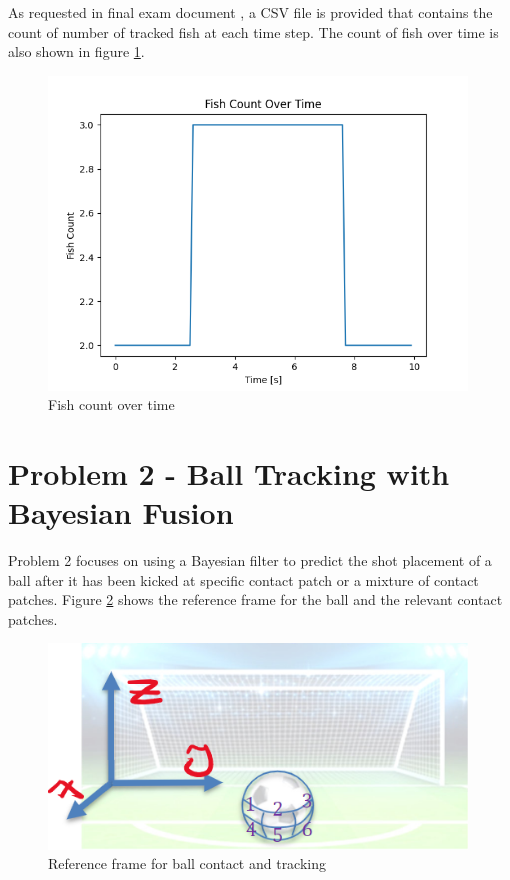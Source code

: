 \documentclass[12pt]{article}
\begin{document}
As requested in final exam document \cite{final-exam}, a CSV file is provided that contains the count of number of tracked fish at each time step. The count of fish over time is also shown in figure \ref{fig:p1-fish-count}.

\begin{figure}[H]
    \centering
    \includegraphics[width=0.99\textwidth]{Problem 1/out/p1_fish_count.png}
    \caption{Fish count over time}
    \label{fig:p1-fish-count}
\end{figure}

\section{Problem 2 - Ball Tracking with Bayesian Fusion}
Problem 2 focuses on using a Bayesian filter to predict the shot placement of a ball after it has been kicked at specific contact patch or a mixture of contact patches. Figure \ref{fig:p2-reference-frame} shows the reference frame for the ball and the relevant contact patches.

\begin{figure}[H]
    \centering
    \includegraphics[width=0.99\textwidth]{Problem 2/assets/axis-plane.png}
    \caption{Reference frame for ball contact and tracking \cite{final-exam}}
    \label{fig:p2-reference-frame}
\end{figure}
\end{document}
